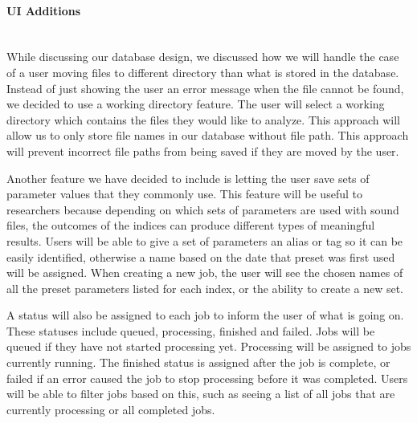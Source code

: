 \paragraph{UI Additions} \mbox{}\\[\paragraphheaderspace]
While discussing our database design, we discussed how we will handle the case of a user moving files to different directory than what is stored in the database. Instead of just showing the user an error message when the file cannot be found, we decided to use a working directory feature. The user will select a working directory which contains the files they would like to analyze. This approach will allow us to only store file names in our database without file path. This approach will prevent incorrect file paths from being saved if they are moved by the user.\par
Another feature we have decided to include is letting the user save sets of parameter values that they commonly use. This feature will be useful to researchers because depending on which sets of parameters are used with sound files, the outcomes of the  indices can produce different types of meaningful results. Users will be able to give a set of parameters an alias or tag so it can be easily identified, otherwise a name based on the date that preset was first used will be assigned. When creating a new job, the user will see the chosen names of all the preset parameters listed for each index, or the ability to create a new set.\par
A status will also be assigned to each job to inform the user of what is going on. These statuses include queued, processing, finished and failed. Jobs will be queued if they have not started processing yet. Processing will be assigned to jobs currently running. The finished status is assigned after the job is complete, or failed if an error caused the job to stop processing before it was completed. Users will be able to filter jobs based on this, such as seeing a list of all jobs that are currently processing or all completed jobs.\par

